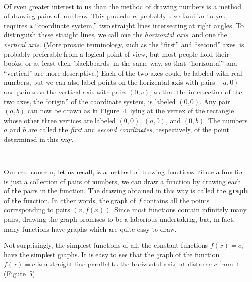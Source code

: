 \begin{center}
\\[0.6em]
\end{center}

Of even greater interest to us than the method of drawing numbers is a method
of drawing pairs of numbers. This procedure, probably also familiar to you,
requires a ``coordinate system,'' two straight lines intersecting at right
angles. To distinguish these straight lines, we call one the \emph{horizontal
axis}, and one the \emph{vertical axis}. (More prosaic terminology, such as the
``first'' and ``second'' axes, is probably preferable from a logical point of
view, but most people hold their books, or at least their blackboards, in the
same way, so that ``horizontal'' and ``vertical'' are more descriptive.) Each
of the two axes could be labeled with real numbers, but we can also label
points on the horizontal axis with pairs $(a,0)$ and points on the vertical
axis with pairs $(0,b)$, so that the intersection of the two axes, the
``origin'' of the coordinate system, is labeled $(0,0)$. Any pair $(a,b)$ can
now be drawn as in Figure~4, lying at the vertex of the rectangle whose other
three vertices are labeled $(0,0)$, $(a,0)$, and $(0,b)$. The numbers $a$ and
$b$ are called the \emph{first} and \emph{second coordinates}, respectively, of
the point determined in this way.

\begin{center}
\\[0.6em]
\end{center}

Our real concern, let us recall, is a method of drawing functions. Since a
function is just a collection of pairs of numbers, we can draw a function by
drawing each of the pairs in the function. The drawing obtained in this way is
called the \textbf{graph} of the function. In other words, the graph of $f$
contains all the points corresponding to pairs $(x,f(x))$. Since most
functions contain infinitely many pairs, drawing the graph promises to be a
laborious undertaking, but, in fact, many functions have graphs which are quite
easy to draw.

Not surprisingly, the simplest functions of all, the constant functions
$f(x)=c$, have the simplest graphs. It is easy to see that the graph of the
function $f(x)=c$ is a straight line parallel to the horizontal axis, at
distance $c$ from it (Figure~5).

